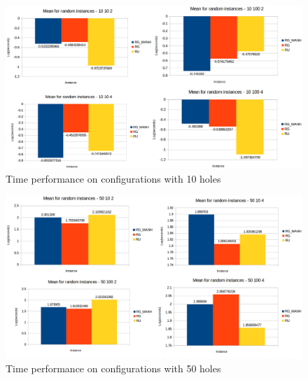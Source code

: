 \begin{figure}[H]
  \centering
  \includegraphics[width=.8\columnwidth]{pics/partI/mean-10.eps}
  \caption{Time performance on configurations with 10 holes}
  \label{fig:mean-time-10}
\end{figure}

\begin{figure}[H]
  \centering
  \includegraphics[width=.8\columnwidth]{pics/partI/mean-50.eps}
  \caption{Time performance on configurations with 50 holes}
  \label{fig:mean-time-50}
\end{figure}
